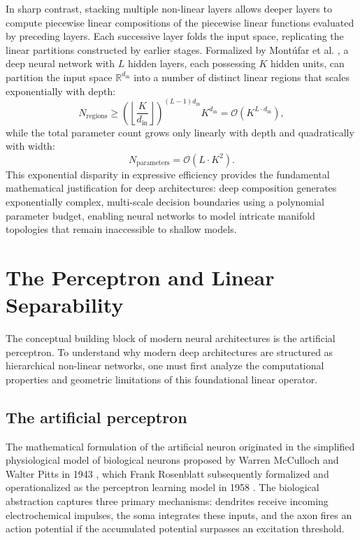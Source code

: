 \documentclass[../../../main.tex]{subfiles}
\begin{document}
In sharp contrast, stacking multiple non-linear layers allows deeper layers to compute piecewise linear compositions of the piecewise linear functions evaluated by preceding layers. Each successive layer folds the input space, replicating the linear partitions constructed by earlier stages. Formalized by Montúfar et al. \citep{montufar2014number}, a deep neural network with $L$ hidden layers, each possessing $K$ hidden units, can partition the input space $\mathbb{R}^{d_{\text{in}}}$ into a number of distinct linear regions that scales exponentially with depth:
\begin{equation}
N_{\text{regions}} \ge \left( \left\lfloor \frac{K}{d_{\text{in}}} \right\rfloor \right)^{(L-1) d_{\text{in}}} K^{d_{\text{in}}} = \mathcal{O}\left( K^{L \cdot d_{\text{in}}} \right),
\end{equation}
while the total parameter count grows only linearly with depth and quadratically with width:
\begin{equation}
N_{\text{parameters}} = \mathcal{O}\left( L \cdot K^2 \right).
\end{equation}
This exponential disparity in expressive efficiency provides the fundamental mathematical justification for deep architectures: deep composition generates exponentially complex, multi-scale decision boundaries using a polynomial parameter budget, enabling neural networks to model intricate manifold topologies that remain inaccessible to shallow models.

\clearpage
\section{The Perceptron and Linear Separability}
\label{sec:perceptron_linear_barrier}

The conceptual building block of modern neural architectures is the artificial perceptron. To understand why modern deep architectures are structured as hierarchical non-linear networks, one must first analyze the computational properties and geometric limitations of this foundational linear operator.

\subsection{The artificial perceptron}
\label{subsec:artificial_perceptron}

The mathematical formulation of the artificial neuron originated in the simplified physiological model of biological neurons proposed by Warren McCulloch and Walter Pitts in 1943 \citep{mcculloch1943}, which Frank Rosenblatt subsequently formalized and operationalized as the perceptron learning model in 1958 \citep{rosenblatt1958}. The biological abstraction captures three primary mechanisms: dendrites receive incoming electrochemical impulses, the soma integrates these inputs, and the axon fires an action potential if the accumulated potential surpasses an excitation threshold.
\end{document}
